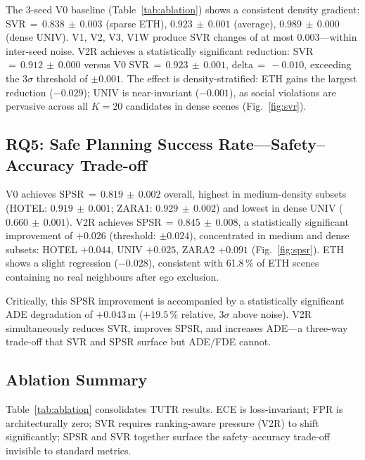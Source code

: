 \documentclass[journal]{IEEEtran}
\begin{document}
The 3-seed V0 baseline (Table~\ref{tab:ablation}) shows a consistent
density gradient: SVR\,\(=\,0.838\,\pm\,0.003\) (sparse ETH),
$0.923\,\pm\,0.001$ (average), $0.989\,\pm\,0.000$ (dense UNIV).
V1, V2, V3, V1W produce SVR changes of at most $0.003$---within
inter-seed noise.
V2R achieves a statistically significant reduction: SVR\,\(=\,0.912\,\pm\,0.000\)
versus V0 SVR\,\(=\,0.923\,\pm\,0.001\), delta\,\(=\,-0.010\),
exceeding the $3\sigma$ threshold of $\pm0.001$.
The effect is density-stratified: ETH gains the largest reduction
($-0.029$); UNIV is near-invariant ($-0.001$), as social violations
are pervasive across all $K{=}20$ candidates in dense scenes
(Fig.~\ref{fig:svr}).

\subsection{RQ5: Safe Planning Success Rate---Safety--Accuracy Trade-off}

V0 achieves SPSR\,\(=\,0.819\,\pm\,0.002\) overall, highest in
medium-density subsets (HOTEL: $0.919\,\pm\,0.001$;
ZARA1: $0.929\,\pm\,0.002$) and lowest in dense UNIV
($0.660\,\pm\,0.001$).
V2R achieves SPSR\,\(=\,0.845\,\pm\,0.008\), a statistically
significant improvement of $+0.026$ (threshold: $\pm0.024$),
concentrated in medium and dense subsets: HOTEL $+0.044$,
UNIV $+0.025$, ZARA2 $+0.091$ (Fig.~\ref{fig:spsr}).
ETH shows a slight regression ($-0.028$), consistent with
61.8\,\% of ETH scenes containing no real neighbours after ego
exclusion.

Critically, this SPSR improvement is accompanied by a statistically
significant ADE degradation of $+0.043$\,m ($+19.5\,\%$ relative,
$3\sigma$ above noise).
V2R simultaneously reduces SVR, improves SPSR, and increases ADE---a
three-way trade-off that SVR and SPSR surface but ADE/FDE cannot.

\subsection{Ablation Summary}

Table~\ref{tab:ablation} consolidates TUTR results.
ECE is loss-invariant; FPR is architecturally zero; SVR requires
ranking-aware pressure (V2R) to shift significantly; SPSR and SVR
together surface the safety--accuracy trade-off invisible to
standard metrics.

\end{document}

